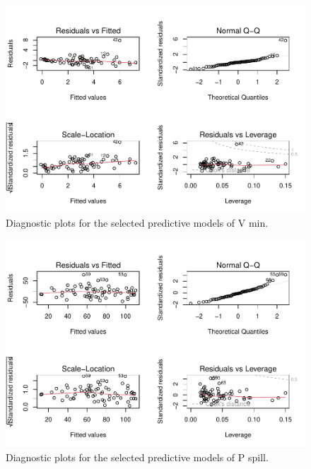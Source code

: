 \documentclass[hess, manuscript]{copernicus}
\begin{document}
\begin{figure}
\includegraphics[width=1\linewidth]{Kouba_2023_end_of_dry_season_manuscript_final_2023.12.29_files/figure-latex/selected_model_diagnostics_vmin-1} \caption{\label{fig:vmin_selected_diagnostics} Diagnostic plots for the selected predictive models of V min.}\label{fig:selected_model_diagnostics_vmin}
\end{figure}

\begin{figure}
\includegraphics[width=1\linewidth]{Kouba_2023_end_of_dry_season_manuscript_final_2023.12.29_files/figure-latex/selected_model_diagnostics_pspsill-1} \caption{\label{fig:vmin_selected_diagnostics} Diagnostic plots for the selected predictive models of P spill.}\label{fig:selected_model_diagnostics_pspsill}
\end{figure}
\end{document}
